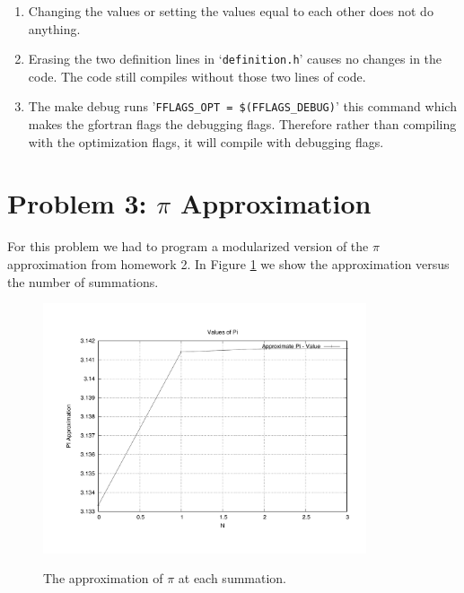 \documentclass[12pt]{article}
\begin{document}
\begin{enumerate}
	\item Changing the values or setting the values equal to each other does not do anything.
	
	\item Erasing the two definition lines in `\texttt{definition.h}' causes no changes in the code. The code still compiles without those two lines of code. 
	
	\item The make debug runs '\texttt{FFLAGS\_OPT = \$(FFLAGS\_DEBUG)}' this command which makes the gfortran flags the debugging flags. Therefore rather than compiling with the optimization flags, it will compile with debugging flags. 
	
	
\end{enumerate}

\section*{{\large Problem 3: $\pi$  Approximation}}

For this problem we had to program a modularized version of the $\pi$ approximation from homework 2. In Figure \ref{fig:pi} we show the approximation versus the number of summations.
			\begin{figure}[h]
				\caption{The approximation of $\pi$ at each summation.}
				\centering
				\includegraphics[width=0.85\textwidth]{./prob3/plots/pi_value.pdf}
				\label{fig:pi}
			\end{figure}
\end{document}
